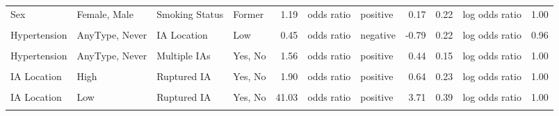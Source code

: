 \begin{landscape}
\begin{table}[!h]
{\begin{tabular}[t]{llllrllrrlr}
Sex & Female, Male & Smoking Status & Former & 1.19 & odds ratio & positive & 0.17 & 0.22 & log odds ratio & 1.00\\
\cellcolor{gray!6}{Sex} & \cellcolor{gray!6}{Female, Male} & \cellcolor{gray!6}{Smoking Status} & \cellcolor{gray!6}{No} & \cellcolor{gray!6}{1.60} & \cellcolor{gray!6}{odds ratio} & \cellcolor{gray!6}{positive} & \cellcolor{gray!6}{0.47} & \cellcolor{gray!6}{0.11} & \cellcolor{gray!6}{log odds ratio} & \cellcolor{gray!6}{1.00}\\
\addlinespace
Hypertension & AnyType, Never & IA Location & Low & 0.45 & odds ratio & negative & -0.79 & 0.22 & log odds ratio & 0.96\\
\cellcolor{gray!6}{Hypertension} & \cellcolor{gray!6}{AnyType, Never} & \cellcolor{gray!6}{IA Location} & \cellcolor{gray!6}{Medium} & \cellcolor{gray!6}{1.34} & \cellcolor{gray!6}{odds ratio} & \cellcolor{gray!6}{positive} & \cellcolor{gray!6}{0.29} & \cellcolor{gray!6}{0.17} & \cellcolor{gray!6}{log odds ratio} & \cellcolor{gray!6}{0.96}\\
Hypertension & AnyType, Never & Multiple IAs & Yes, No & 1.56 & odds ratio & positive & 0.44 & 0.15 & log odds ratio & 1.00\\
\addlinespace
\cellcolor{gray!6}{IA Size} & \cellcolor{gray!6}{} & \cellcolor{gray!6}{Ruptured IA} & \cellcolor{gray!6}{Yes, No} & \cellcolor{gray!6}{0.66} & \cellcolor{gray!6}{odds ratio} & \cellcolor{gray!6}{negative} & \cellcolor{gray!6}{-0.42} & \cellcolor{gray!6}{0.09} & \cellcolor{gray!6}{log odds ratio} & \cellcolor{gray!6}{1.00}\\
\addlinespace
IA Location & High & Ruptured IA & Yes, No & 1.90 & odds ratio & positive & 0.64 & 0.23 & log odds ratio & 1.00\\
\cellcolor{gray!6}{IA Location} & \cellcolor{gray!6}{Medium} & \cellcolor{gray!6}{Ruptured IA} & \cellcolor{gray!6}{Yes, No} & \cellcolor{gray!6}{4.81} & \cellcolor{gray!6}{odds ratio} & \cellcolor{gray!6}{positive} & \cellcolor{gray!6}{1.57} & \cellcolor{gray!6}{0.22} & \cellcolor{gray!6}{log odds ratio} & \cellcolor{gray!6}{1.00}\\
IA Location & Low & Ruptured IA & Yes, No & 41.03 & odds ratio & positive & 3.71 & 0.39 & log odds ratio & 1.00\\
\addlinespace
\cellcolor{gray!6}{Multiple IAs} & \cellcolor{gray!6}{Yes, No} & \cellcolor{gray!6}{IA Size} & \cellcolor{gray!6}{} & \cellcolor{gray!6}{0.73} & \cellcolor{gray!6}{exp. cor. coef.} & \cellcolor{gray!6}{negative} & \cellcolor{gray!6}{-0.31} & \cellcolor{gray!6}{0.07} & \cellcolor{gray!6}{correlation} & \cellcolor{gray!6}{1.00}\\

\end{tabular}}
\end{table}
\end{landscape}
